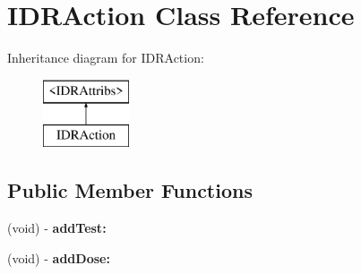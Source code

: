 \hypertarget{interface_i_d_r_action}{
\section{IDRAction Class Reference}
\label{interface_i_d_r_action}
}
Inheritance diagram for IDRAction:\begin{figure}[H]
\begin{center}
\leavevmode
\includegraphics[height=2.000000cm]{interface_i_d_r_action}
\end{center}
\end{figure}
\subsection*{Public Member Functions}
\begin{DoxyCompactItemize}
\item 
\hypertarget{interface_i_d_r_action_a9bb8544cf53a6d780f1c88ce0f5714e0}{
(void) -\/ {\bfseries addTest:}}
\label{interface_i_d_r_action_a9bb8544cf53a6d780f1c88ce0f5714e0}

\item 
\hypertarget{interface_i_d_r_action_a6f49945c6c9a38fb3a8792c3bf4914f2}{
(void) -\/ {\bfseries addDose:}}
\label{interface_i_d_r_action_a6f49945c6c9a38fb3a8792c3bf4914f2}

\end{DoxyCompactItemize}
